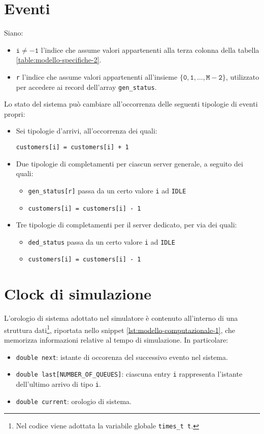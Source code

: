 \section{Eventi}\label{sec:modello-computazionale-eventi}
Siano:
\begin{itemize}
\item $\mathtt{i \neq -1}$  l'indice che assume valori appartenenti alla terza colonna della tabella \ref{table:modello-specifiche-2}.
\item \texttt{r} l'indice che assume valori appartenenti all'insieme $\mathtt{\lbrace 0, 1, \dots, M - 2 \rbrace}$, utilizzato per accedere ai record dell'array \texttt{gen\_status}.
\end{itemize}
Lo stato del sistema può cambiare all'occorrenza delle seguenti tipologie di eventi propri:
\begin{itemize}
\item Sei tipologie d'arrivi, all'occorrenza dei quali:
\begin{center}
\texttt{customers[i] = customers[i] + 1}
\end{center}
\item Due tipologie di completamenti per ciascun server generale, a seguito dei quali:
\begin{itemize}
\item \texttt{gen\_status[r]} passa da un certo valore \texttt{i} ad \texttt{IDLE}
\item \texttt{customers[i] = customers[i] - 1}
\end{itemize}
\item Tre tipologie di completamenti per il server dedicato, per via dei quali:
\begin{itemize}
\item \texttt{ded\_status} passa da un certo valore \texttt{i} ad \texttt{IDLE}
\item \texttt{customers[i] = customers[i] - 1}
\end{itemize}
\end{itemize} 
\section{Clock di simulazione}\label{sec:modello-computazionale-clock}
L'orologio di sistema adottato nel simulatore è contenuto all'interno di una struttura dati\footnote{Nel codice viene adottata la variabile globale \texttt{{\color{code_purple}times\_t} t}.}, riportata nello snippet \ref{lst:modello-computazionale-1}, che memorizza informazioni relative al tempo di simulazione. In particolare:
\begin{itemize}
\item \texttt{{\color{code_purple}double} next}: istante di occorenza del successivo evento nel sistema.
\item \texttt{{\color{code_purple}double} last[NUMBER\_OF\_QUEUES]}: ciascuna entry \texttt{i} rappresenta l'istante dell'ultimo arrivo di tipo \texttt{i}.
\item \texttt{{\color{code_purple}double} current}: orologio di sistema.
\end{itemize}

